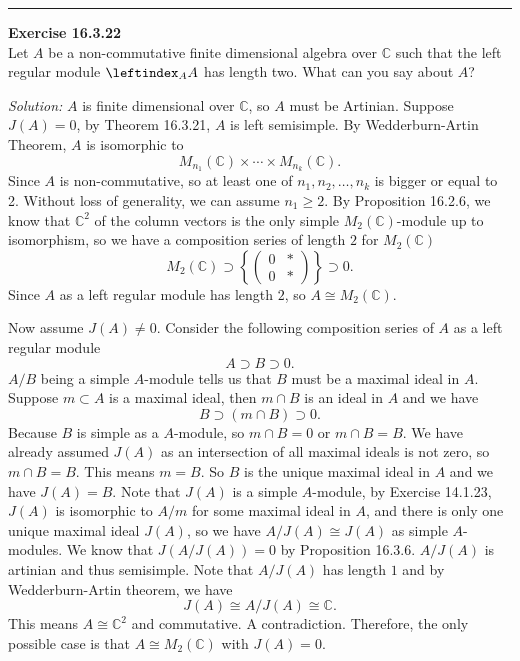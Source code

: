 \documentclass[a4paper, 12pt]{article}
\newenvironment{problem}[2][Exercise]
    { \begin{mdframed}[backgroundcolor=gray!20] \textbf{#1 #2} \\}
    {  \end{mdframed}}
\newenvironment{solution}
    {\textit{Solution:}}
    {}
\begin{document}
\noindent\rule{7in}{2.8pt}
\begin{problem}{16.3.22}
Let \(A\) be a non-commutative finite dimensional algebra over \(\mathbb{C}\) such that the left regular module \(\leftindex_A A\) has length two. What can you say about \(A\)?
\end{problem}
\begin{solution}
\(A\) is finite dimensional over \(\mathbb{C}\), so \(A\) must be Artinian. Suppose \(J(A)=0\), by Theorem 16.3.21, \(A\) is left semisimple. By Wedderburn-Artin Theorem, \(A\) is isomorphic to 
\[M_{n_1}(\mathbb{C})\times\cdots\times M_{n_k}(\mathbb{C}).\]
Since \(A\) is non-commutative, so at least one of \(n_1,n_2,\ldots,n_k\) is bigger or equal to 2. Without loss of generality, we can assume \(n_1\geq 2\). By Proposition 16.2.6, we know that \(\mathbb{C}^2\) of the column vectors is the only 
simple \(M_2(\mathbb{C})\)-module up to isomorphism, so we have a composition series of length \(2\) for \(M_2(\mathbb{C})\) 
\[M_2(\mathbb{C})\supset \left\{ \begin{pmatrix}
0&*\\ 
0&*
\end{pmatrix} \right\}\supset 0.\]
Since \(A\) as a left regular module has length \(2\), so \(A\cong M_2(\mathbb{C})\). 

Now assume \(J(A)\neq 0\). Consider the following composition series of \(A\) as a left regular module
\[A\supset B\supset 0.\]
\(A/B\) being a simple \(A\)-module tells us that \(B\) must be a maximal ideal in \(A\). Suppose \(m\subset A\) is a maximal ideal, then \(m\cap B\) is an ideal in \(A\) and we have 
\[B\supset (m\cap B)\supset 0.\]
Because \(B\) is simple as a \(A\)-module, so \(m\cap B=0\) or \(m\cap B=B\). We have already assumed \(J(A)\) as an intersection of all maximal ideals is not zero, so \(m\cap B=B\). This means \(m=B\). So \(B\) is the unique maximal ideal in \(A\) and we have 
\(J(A)=B\). Note that \(J(A)\) is a simple \(A\)-module, by Exercise 14.1.23, \(J(A)\) is isomorphic to \(A/m\) for some maximal ideal in \(A\), and there is only one unique maximal ideal \(J(A)\), so we have 
\(A/J(A)\cong J(A)\) as simple \(A\)-modules. We know that \(J(A/J(A))=0\) by Proposition 16.3.6. \(A/J(A)\) is artinian and thus semisimple. Note that \(A/J(A)\) has length \(1\) and by Wedderburn-Artin theorem, we have 
\[J(A)\cong A/J(A)\cong \mathbb{C}.\]
This means \(A\cong \mathbb{C}^2\) and commutative. A contradiction. Therefore, the only possible case is that \(A\cong M_2(\mathbb{C})\) with \(J(A)=0\).  
\end{solution}
\end{document}
